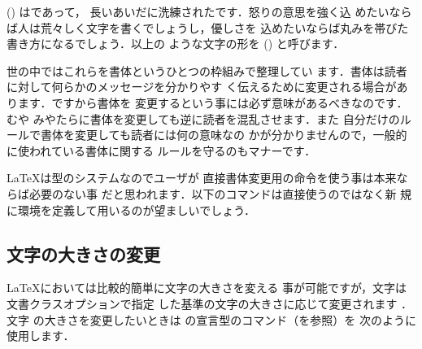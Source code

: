 {%
%
%
%

 () はであって，
長いあいだに洗練されたです．怒りの意思を強く込
めたいならば人は荒々しく文字を書くでしょうし，優しさを
込めたいならば丸みを帯びた書き方になるでしょう．以上の
ような文字の形を () と呼びます．

世の中ではこれらを書体というひとつの枠組みで整理してい
ます．書体は読者に対して何らかのメッセージを分かりやす
く伝えるために変更される場合があります．ですから書体を
変更するという事には必ず意味があるべきなのです．むや
みやたらに書体を変更しても逆に読者を混乱させます．また
自分だけのルールで書体を変更しても読者には何の意味なの
かが分かりませんので，一般的に使われている書体に関する
ルールを守るのもマナーです．

{\LaTeX}は型のシステムなのでユーザが
直接書体変更用の命令を使う事は本来ならば必要のない事
だと思われます．以下のコマンドは直接使うのではなく新
規に環境を定義して用いるのが望ましいでしょう．


\subsection{文字の大きさの変更}
{\LaTeX}においては比較的簡単に文字の大きさを変える
事が可能ですが，文字は文書クラスオプションで指定
した基準の文字の大きさに応じて変更されます ．文字
の大きさを変更したいときは
の宣言型のコマンド（を参照）を
次のように使用します．

}
